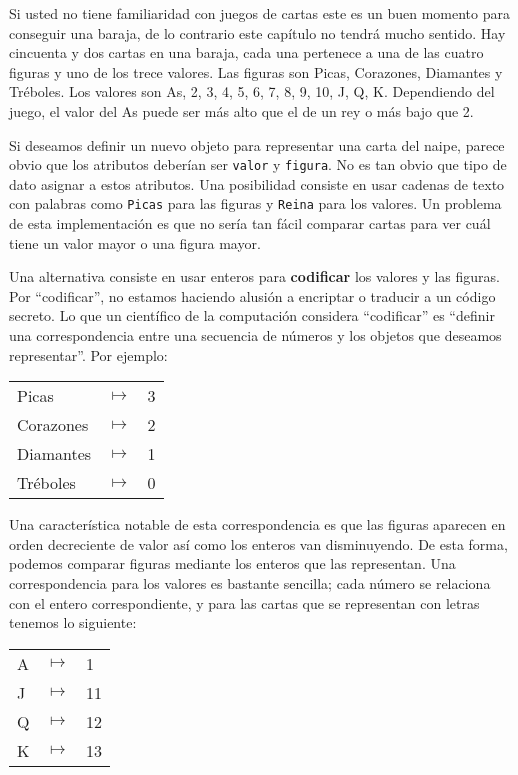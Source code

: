 Si usted no tiene familiaridad con juegos de cartas este es un buen momento para
conseguir una baraja, de lo contrario este capítulo no tendrá mucho sentido.
Hay cincuenta y dos cartas en una baraja, cada una pertenece a una de las
cuatro figuras y uno de los trece valores. Las figuras son Picas, Corazones,
 Diamantes y Tréboles. Los valores son As,  2, 3, 4, 5,
6, 7, 8, 9, 10, J, Q, K. Dependiendo del juego, el valor del As puede ser más 
alto que el de un rey o más bajo que 2.


Si deseamos definir un nuevo objeto para representar una carta del naipe, parece
obvio que los atributos deberían ser \texttt{valor} y \texttt{figura}. No es tan 
obvio que tipo de dato asignar a estos atributos. Una posibilidad consiste en 
usar cadenas de texto con palabras como \texttt{Picas} para las figuras y 
\texttt{Reina} para los valores. Un problema de esta implementación es que no
sería tan fácil comparar cartas para ver cuál tiene un valor mayor o una figura mayor.


Una alternativa consiste en usar enteros para {\bf codificar} los valores y 
las figuras. Por  ``codificar'', no estamos haciendo alusión a encriptar 
o traducir a un código secreto. Lo que un científico de la computación 
considera ``codificar'' es ``definir una correspondencia entre una secuencia 
de números y los objetos que deseamos representar''. Por ejemplo:

\beforefig
\begin{tabular}{l c l}
Picas & $\mapsto$ & 3 \\
Corazones & $\mapsto$ & 2 \\
Diamantes & $\mapsto$ & 1 \\
Tréboles & $\mapsto$ & 0
\end{tabular}
\afterfig

Una característica notable de esta correspondencia es que las figuras aparecen 
en orden decreciente de valor así como los enteros van disminuyendo. De esta forma,
 podemos comparar figuras mediante los enteros que las 
representan.  Una correspondencia para los valores es bastante sencilla;
cada número se relaciona con el entero correspondiente, y para las cartas
que se representan con letras tenemos lo siguiente:

\beforefig
\begin{tabular}{l c l}
A & $\mapsto$ & 1 \\
J & $\mapsto$ & 11 \\
Q & $\mapsto$ & 12 \\
K & $\mapsto$ & 13 \\
\end{tabular}
\afterfig

